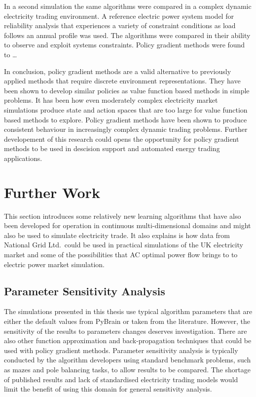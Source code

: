 In a second simulation the same algorithms were compared in a complex dynamic
electricity trading environment.  A reference electric power system model for
reliability analysis that experiences a variety of constraint conditions as
load follows an annual profile was used.  The algorithms were compared in their
ability to observe and exploit systems constraints.  Policy gradient methods
were found to \ldots

In conclusion, policy gradient methods are a valid alternative to previously
applied methods that require discrete environment representations.  They have
been shown to develop similar policies as value function based methods in
simple problems.  It has been how even moderately complex electricity market
simulations produce state and action spaces that are too large for value
function based methods to explore.  Policy gradient methods have been shown to
produce consistent behaviour in increasingly complex dynamic trading problems.
Further developement of this research could opens the opportunity for policy
gradient methods to be used in descision support and automated energy trading
applications.

\section{Further Work}
\label{sec:furtherwork}
This section introduces some relatively new learning algorithms that have
also been developed for operation in continuous multi-dimensional domains and
might also be used to simulate electricity trade.
It also explains is how data from National Grid Ltd.~could be used in practical
simulations of the UK electricity market and some of the possibilities that AC
optimal power flow brings to to electric power market simulation.

\subsection{Parameter Sensitivity Analysis}
The simulations presented in this thesis use typical algorithm parameters that
are either the default values from PyBrain or taken from the literature.
However, the sensitivity of the results to parameters changes deserves
investigation.  There are also other function approximation and
back-propagation techniques that could be used with policy gradient methods.
Parameter sensitivity analysis is typically conducted by the algorithm
developers using standard benchmark problems, such as mazes and pole balancing
tasks, to allow results to be compared.  The shortage of published results and
lack of standardised electricity trading models would limit the benefit of
using this domain for general sensitivity analysis.


